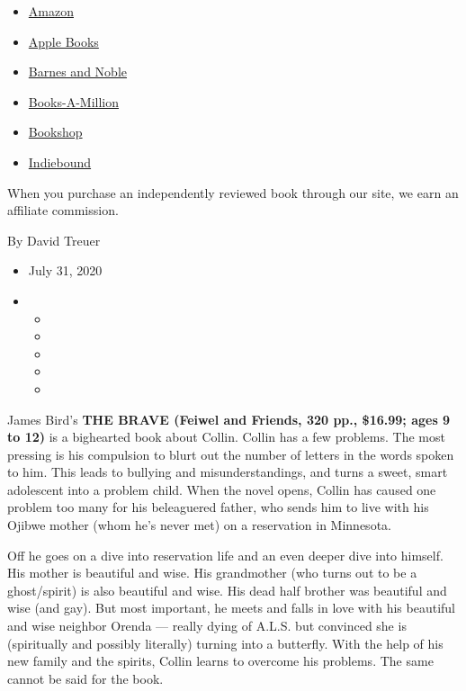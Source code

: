 \begin{itemize}
\tightlist
\item
  \href{https://www.amazon.com/gp/search?index=books\&tag=NYTBSREV-20\&field-keywords=The+Brave+James+Bird}{Amazon}
\item
  \href{https://du-gae-books-dot-nyt-du-prd.appspot.com/buy?title=The+Brave\&author=James+Bird}{Apple
  Books}
\item
  \href{https://www.anrdoezrs.net/click-7990613-11819508?url=https\%3A\%2F\%2Fwww.barnesandnoble.com\%2Fw\%2F\%3Fean\%3D9781250247759}{Barnes
  and Noble}
\item
  \href{https://www.anrdoezrs.net/click-7990613-35140?url=https\%3A\%2F\%2Fwww.booksamillion.com\%2Fp\%2FThe\%2BBrave\%2FJames\%2BBird\%2F9781250247759}{Books-A-Million}
\item
  \href{https://bookshop.org/a/3546/9781250247759}{Bookshop}
\item
  \href{https://www.indiebound.org/book/9781250247759?aff=NYT}{Indiebound}
\end{itemize}

When you purchase an independently reviewed book through our site, we
earn an affiliate commission.

By David Treuer

\begin{itemize}
\item
  July 31, 2020
\item
  \begin{itemize}
  \item
  \item
  \item
  \item
  \item
  \end{itemize}
\end{itemize}

James Bird's \textbf{THE BRAVE (Feiwel and Friends, 320 pp., \$16.99;
ages 9 to 12)} is a bighearted book about Collin. Collin has a few
problems. The most pressing is his compulsion to blurt out the number of
letters in the words spoken to him. This leads to bullying and
misunderstandings, and turns a sweet, smart adolescent into a problem
child. When the novel opens, Collin has caused one problem too many for
his beleaguered father, who sends him to live with his Ojibwe mother
(whom he's never met) on a reservation in Minnesota.

Off he goes on a dive into reservation life and an even deeper dive into
himself. His mother is beautiful and wise. His grandmother (who turns
out to be a ghost/spirit) is also beautiful and wise. His dead half
brother was beautiful and wise (and gay). But most important, he meets
and falls in love with his beautiful and wise neighbor Orenda --- really
dying of A.L.S. but convinced she is (spiritually and possibly
literally) turning into a butterfly. With the help of his new family and
the spirits, Collin learns to overcome his problems. The same cannot be
said for the book.

